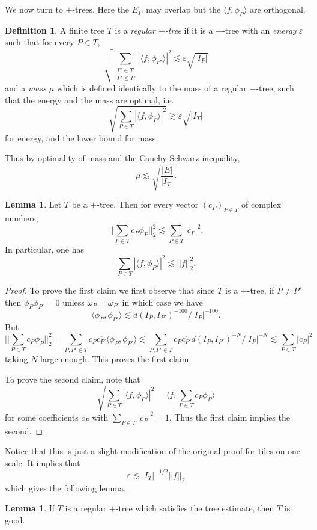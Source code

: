\documentclass[12pt]{report}
\newcommand{\dfn}[1]{\emph{#1}\index{#1}}
\theoremstyle{definition}
\newtheorem{lemma}[theorem]{Lemma}
\newtheorem{definition}[theorem]{Definition}
\begin{document}
We now turn to $+$-trees. Here the $E_P^+$ may overlap but the $\langle f,\phi_P\rangle$ are orthogonal.
\begin{definition}
A finite tree $T$ is a \dfn{regular $+$-tree} if it is a $+$-tree with an \dfn{energy} $\varepsilon$ such that for every $P \in T$,
$$\sqrt{\sum_{\substack{P' \in T\\P' \leq P}} |\langle f, \phi_{P'}\rangle|^2} \lesssim \varepsilon\sqrt{|I_P|}$$
and a \dfn{mass} $\mu$ which is defined identically to the mass of a regular $-$-tree, such that the energy and the mass are optimal, i.e.
$$\sqrt{\sum_{P \in T} |\langle f, \phi_P\rangle|^2} \gtrsim \varepsilon\sqrt{|I_T|}$$
for energy, and the lower bound for mass.
\end{definition}
Thus by optimality of mass and the Cauchy-Schwarz inequality,
$$\mu \lesssim \sqrt{\frac{|E|}{|I_T|}}.$$
\begin{lemma}
Let $T$ be a $+$-tree. Then for every vector $(c_P)_{P \in T}$ of complex numbers,
$$||\sum_{P \in T} c_P\phi_P||_2^2 \lesssim \sum_{P \in T} |c_P|^2.$$
In particular, one has
$$\sum_{P \in T} |\langle f, \phi_P\rangle|^2 \lesssim ||f||_2^2.$$
\end{lemma}
\begin{proof}
To prove the first claim we first observe that since $T$ is a $+$-tree, if $P \neq P'$ then $\phi_P \phi_{P'} = 0$ unless $\omega_P = \omega_{P'}$ in which case we have
$$\langle \phi_P, \phi_{P'}\rangle \lesssim d(I_P, I_{P'})^{-100}/|I_P|^{-100}.$$
But
$$||\sum_{P \in T} c_P\phi_P||_2^2 = \sum_{P, P' \in T} c_P \overline{c_{P'}} \langle \phi_P, \phi_{P'}\rangle \lesssim \sum_{P, P' \in T} c_P \overline{c_{P'}}  d(I_P, I_{P'})^{-N}/|I_P|^{-N} \lesssim \sum_{P \in T} |c_P|^2$$
taking $N$ large enough. This proves the first claim.

To prove the second claim, note that
$$\sqrt{\sum_{P \in T} |\langle f, \phi_P\rangle|^2} = \langle f, \sum_{P \in T} c_P \phi_P \rangle$$
for some coefficients $c_P$ with $\sum_{P \in T} |c_P|^2 = 1$. Thus the first claim implies the second.
\end{proof}
Notice that this is just a slight modification of the original proof for tiles on one scale.
It implies that
$$\varepsilon \lesssim |I_T|^{-1/2}||f||_2$$
which gives the following lemma.
\begin{lemma}
If $T$ is a regular $+$-tree which satisfies the tree estimate, then $T$ is good.
\end{lemma}
\end{document}

